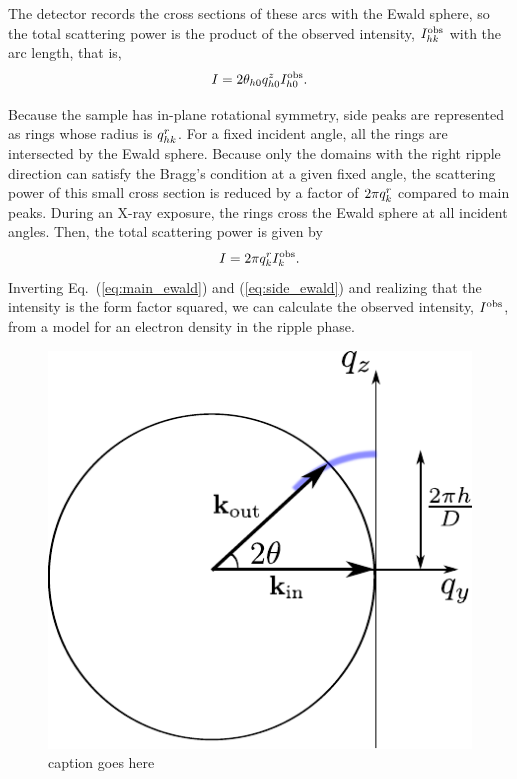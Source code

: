 The detector records the cross sections of these arcs with the 
Ewald sphere, so the total scattering power is the product of the observed intensity,
$I_{hk}^\mathrm{obs}$ with the arc length, that is, 
\begin{equation}
  I = 2\theta_{h0}q_{h0}^z I_{h0}^\mathrm{obs}. \label{eq:main_ewald}
\end{equation}

Because the sample has in-plane rotational symmetry, side peaks are represented as
rings whose radius is $q_{hk}^r$. For a fixed incident
angle, all the rings are intersected by the Ewald sphere. Because only the domains
with the right ripple direction can satisfy the Bragg's condition at a given fixed
angle, the scattering power of this small cross section is reduced by 
a factor of $2\pi q_{k}^r$ compared to main peaks. During 
an X-ray exposure, the rings cross the Ewald sphere
at all incident angles. Then, the total scattering power is given by
\begin{equation}
  I=2\pi q_{k}^r I_{k}^\mathrm{obs}. \label{eq:side_ewald}
\end{equation}
Inverting Eq.~(\ref{eq:main_ewald}) and (\ref{eq:side_ewald}) 
and realizing that the intensity is the form factor
squared, we can calculate the observed intensity, $I_{}^\mathrm{obs}$, 
from a model for an electron density in the ripple phase.

\begin{figure}[htbp]
  \centering
  \includegraphics[scale=1]{figures/ripple/ewald_main}
  \caption{caption goes here}
  \label{fig:ewald_main}
\end{figure}


